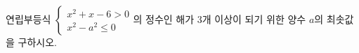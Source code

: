 연립부등식 $\begin{cases} x^2+x-6>0 \\ x^2-a^2\le 0 \end{cases}$의 정수인 해가 3개 이상이 되기 위한 양수 $a$의 최솟값을 구하시오.
